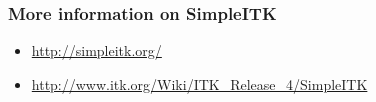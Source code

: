 {
\begin{frame}
\frametitle{More information on SimpleITK}
\Huge
\begin{itemize}
  \item \url{http://simpleitk.org/}
  \item \url{http://www.itk.org/Wiki/ITK_Release_4/SimpleITK}
\end{itemize}
\end{frame}
}

